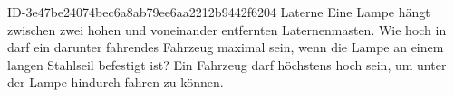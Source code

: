 \begin{exercise}
      {ID-3e47be24074bec6a8ab79ee6aa2212b9442f6204}
      {Laterne}
  \ifproblem\problem
    Eine Lampe hängt zwischen zwei  hohen und  voneinander
    entfernten Laternenmasten. Wie hoch in darf ein darunter fahrendes Fahrzeug
    maximal sein, wenn die Lampe an einem  langen Stahlseil
    befestigt ist?
  \fi
  \ifoutcome\outcome
    Ein Fahrzeug darf höchstens  hoch sein,
    um unter der Lampe hindurch fahren zu können.
  \fi
\end{exercise}
